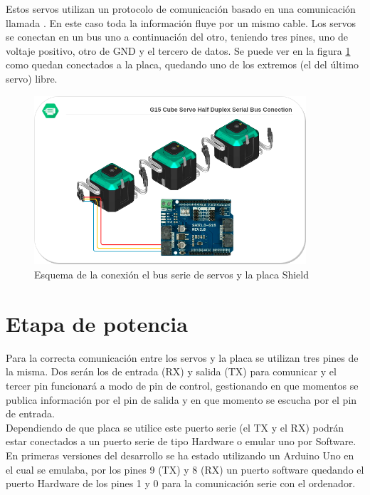 	Estos servos utilizan un protocolo de comunicación basado en una comunicación llamada . En este caso toda la información fluye por un mismo cable. Los servos se conectan en un bus uno a continuación del otro, teniendo tres pines, uno de voltaje positivo, otro de GND y el tercero de datos. Se puede ver en la figura \ref{fig:Electronica:bus-servos} como quedan conectados a la placa, quedando uno de los extremos (el del último servo) libre.
    \begin{figure}[H]
    	\centering
    	\includegraphics[width=0.9\textwidth]{figuras/Imagenes_Electronica/G15_bus_conection.png}   
    	\caption{Esquema de la conexión el bus serie de servos y la placa Shield}
    	\label{fig:Electronica:bus-servos}
    \end{figure}

\section{Etapa de potencia} \label{sec:Electronica:Potencia}

	Para la correcta comunicación entre los servos y la placa se utilizan tres pines de la misma. Dos serán los de entrada (RX) y salida (TX) para comunicar y el tercer pin funcionará a modo de pin de control, gestionando en que momentos se publica información por el pin de salida y en que momento se escucha por el pin de entrada.
	\\
	
	Dependiendo de que placa se utilice este puerto serie (el TX y el RX) podrán estar conectados a un puerto serie de tipo Hardware o emular uno por Software. 
	\\
	
	En primeras versiones del desarrollo se ha estado utilizando un Arduino Uno en el cual se emulaba, por los pines 9 (TX) y 8 (RX) un puerto software quedando el puerto Hardware de los pines 1 y 0 para la comunicación serie con el ordenador.
	\\
	
